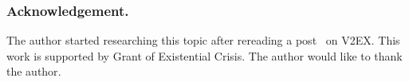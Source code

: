 \subsubsection{Acknowledgement.}
The author started researching this topic after rereading a post~\cite{V2EX:759538} on V2EX.
This work is supported by {\color{red}Grant of Existential Crisis}.
The author would like to thank {\color{red}the author}.
